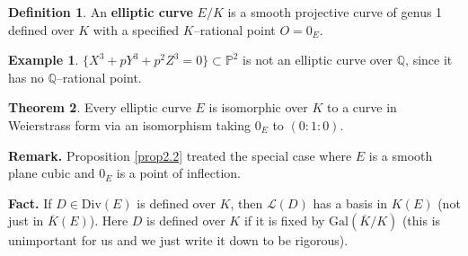 \documentclass{article}
\theoremstyle{definition}
\newtheorem{theorem}{Theorem}[section]
\newtheorem{example}[theorem]{Example}
\newtheorem{defn}{Definition}[section]
\begin{document}
\begin{defn}
    An \textbf{elliptic curve} $E/K$ is a smooth projective curve of genus 1 defined over $K$ with a specified $K$--rational point $O = 0_E$.
\end{defn}
\begin{example}
    $\{X^3 + pY^3 + p^2Z^3 = 0\} \subset \mathbb{P}^2$ is not an elliptic curve over $\mathbb{Q}$, since it has no $\mathbb{Q}$--rational point.
\end{example}
\begin{theorem}
    Every elliptic curve $E$ is isomorphic over $K$ to a curve in Weierstrass form via an isomorphism taking $0_E$ to $(0:1:0)$.
\end{theorem}
\textbf{Remark.} Proposition \ref{prop2.2} treated the special case where $E$ is a smooth plane cubic and $0_E$ is a point of inflection.
\vspace{1mm}
 
\textbf{Fact.} If $D \in \text{Div}(E)$ is defined over $K$, then $\mathcal{L}(D)$ has a basis in $K(E)$ (not just in $\overline{K}(E)$). Here $D$ is defined over $K$ if it is fixed by $\text{Gal}(\overline{K}/K)$ (this is unimportant for us and we just write it down to be rigorous).
\end{document}
